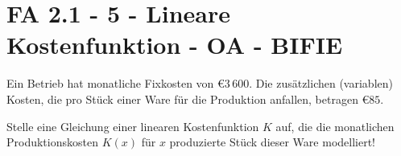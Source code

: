 \section{FA 2.1 - 5 - Lineare Kostenfunktion - OA - BIFIE}

\begin{beispiel}[FA 2.1]{1} %
Ein Betrieb hat monatliche Fixkosten von \euro $3\,600$. Die zusätzlichen (variablen) Kosten, die pro Stück einer Ware für die Produktion anfallen, betragen \euro $85$.

Stelle eine Gleichung einer linearen Kostenfunktion $K$ auf, die die monatlichen Produktionskosten $K(x)$ für $x$ produzierte Stück dieser Ware modelliert!
\leer

\end{beispiel}